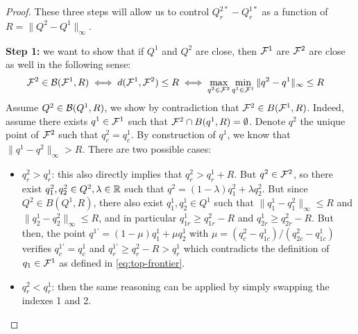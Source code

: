 \begin{proof}
These three steps will allow us to control $Q_r^{2*} - Q_r^{1*}$ as a function of $R = \|Q^2-Q^1\|_\infty$.

\textbf{Step 1:} we want to show that if $Q^1$ and $Q^2$ are close, then $\mathcal{F}^1$ are $\mathcal{F}^2$ are close as well in the following sense:
\begin{align}
    \mathcal{F}^2\in\mathcal{B}(\mathcal{F}^1, R) &\iff d(\mathcal{F}^1, \mathcal{F}^2) \leq R \iff \max_{q^2\in\mathcal{F}^2}\min_{q^1\in\mathcal{F}^1}\|q^2-q^1\|_\infty \leq R
    \label{eq:ball-set}
\end{align}
Assume $Q^2\in\mathcal{B}(Q^1,R)$, we show by contradiction that $\mathcal{F}^2 \in B(\mathcal{F}^1, R)$. Indeed, assume there exists $q^1\in \mathcal{F}^1$ such that $\mathcal{F}^2 \cap B(q^1, R) = \emptyset$. Denote $q^2$ the unique point of $\mathcal{F}^2$ such that $q^2_c = q^1_c$. By construction of $q^1$, we know that $\|q^1-q^2\|_\infty > R$. There are two possible cases:
\begin{itemize}
    \item $q^2_r > q^1_r$: this also directly implies that $q^2_r > q^1_r + R$. But $q^2\in\mathcal{F}^2$, so there exist $q^2_1, q^2_2\in Q^{2},\lambda\in\mathbb{R}$ such that $q^2 = (1-\lambda)q^2_1 + \lambda q^2_2$. But since $Q^2\in B(Q^1, R)$, there also exist $q_1^1, q^1_2\in Q^1$ such that $\|q^1_1-q^2_1\|_\infty \leq R$ and $\|q^1_2-q^2_2\|_\infty \leq R$, and in particular $q^1_{1r}\geq q^2_{1r}-R$ and $q^1_{2r}\geq q^2_{2r}-R$. But then, the point $q^{1'}=(1-\mu)q^1_1 + \mu q^1_2$ with $\mu=(q^2_c-q^1_{1c})/(q^2_{2c}-q^1_{1c})$ verifies $q^{1'}_c = q^1_c$ and $q^{1'}_r \geq q^2_r - R > q^1_r$ which contradicts the definition of $q_1\in\mathcal{F}^1$ as defined in \eqref{eq:top-frontier}.
    \item $q^2_r < q^1_r$: then the same reasoning can be applied by simply swapping the indexes 1 and 2.
\end{itemize}



\end{proof}
